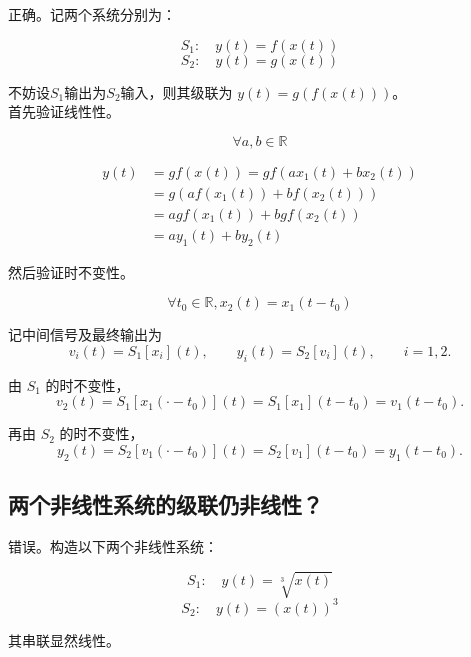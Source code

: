 \documentclass[UTF8, fontset=fandol,12pt, a4paper]{ctexart}
\begin{document}
正确。记两个系统分别为：

$$S_1: \quad y(t) = f(x(t))$$
$$S_2: \quad y(t) = g(x(t))$$

不妨设$S_1$输出为$S_2$输入，则其级联为 $y(t) = g(f(x(t)))$。 \\

首先验证线性性。

$$\forall a, b \in \mathbb{R}$$

\begin{align}
  y(t) &= gf(x(t)) = gf(ax_1(t)+bx_2(t)) \\
       &= g(af(x_1(t)) + bf(x_2(t))) \\
       &= agf(x_1(t)) + bgf(x_2(t)) \\
       &= ay_1(t) + by_2(t)
\end{align}

然后验证时不变性。

$$\forall t_0 \in \mathbb{R}, x_2(t) = x_1(t-t_0)$$

记中间信号及最终输出为
\[
v_i(t)=S_1[x_i](t),\qquad
y_i(t)=S_2[v_i](t),\qquad i=1,2.
\]

由 $S_1$ 的时不变性，
\[
v_2(t)=S_1[x_1(\cdot-t_0)](t)
      =S_1[x_1](t-t_0)
      =v_1(t-t_0).
\]

再由 $S_2$ 的时不变性，
\[
y_2(t)=S_2[v_1(\cdot-t_0)](t)
      =S_2[v_1](t-t_0)
      =y_1(t-t_0).
\]



\subsection{两个非线性系统的级联仍非线性？}

错误。构造以下两个非线性系统：

$$S_1: \quad y(t) = \sqrt[3]{x(t)}$$
$$S_2: \quad y(t) = (x(t))^3$$

其串联显然线性。
\end{document}
